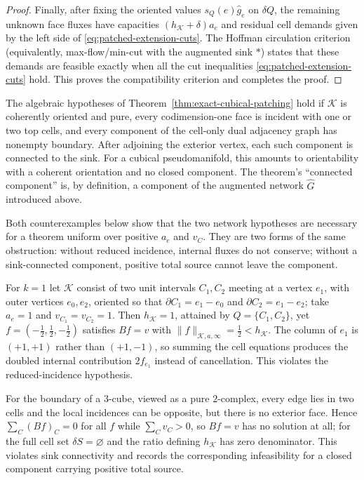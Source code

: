 \begin{proof}
Finally, after fixing the oriented values
$s_Q(e)\widehat g_e$ on $\delta Q$, the remaining unknown
face fluxes have capacities $(h_{\mathcal K}+\delta)a_e$ and residual cell
demands given by the left side of \eqref{eq:patched-extension-cuts}.  The
Hoffman circulation criterion \cite{Hoffman1960} (equivalently, max-flow/min-cut with the
augmented sink $\ast$)
states that these demands are feasible exactly when all the cut inequalities
\eqref{eq:patched-extension-cuts} hold.  This proves the compatibility
criterion and completes the proof.
\end{proof}

\begin{remark}
The algebraic hypotheses of Theorem~\ref{thm:exact-cubical-patching} hold if
$\mathcal K$ is coherently oriented and pure, every codimension-one face is
incident with one or two top cells, and every component of the cell-only dual
adjacency graph has nonempty boundary. After adjoining the exterior vertex,
each such component is connected to the sink. For a cubical pseudomanifold,
this amounts to orientability with a coherent orientation and no closed
component. The theorem's ``connected component'' is, by definition, a
component of the augmented network $\widehat G$ introduced above.

Both counterexamples below show that the two network hypotheses are necessary
for a theorem uniform over positive $a_e$ and $v_C$. They are two forms of the
same obstruction: without reduced incidence, internal fluxes do not conserve;
without a sink-connected component, positive total source cannot leave the
component.

For $k=1$ let $\mathcal K$ consist of two unit intervals $C_1,C_2$ meeting at a
vertex $e_1$, with outer vertices $e_0,e_2$, oriented so that
$\partial C_1=e_1-e_0$ and $\partial C_2=e_1-e_2$; take $a_e=1$ and
$v_{C_1}=v_{C_2}=1$. Then $h_{\mathcal K}=1$, attained by
$Q=\{C_1,C_2\}$, yet $f=(-\tfrac12,\tfrac12,-\tfrac12)$ satisfies $Bf=v$
with $\|f\|_{\mathcal K,a,\infty}=\tfrac12<h_{\mathcal K}$. The column of
$e_1$ is $(+1,+1)$ rather than $(+1,-1)$, so summing the cell equations
produces the doubled internal contribution $2f_{e_1}$ instead of cancellation.
This violates the reduced-incidence hypothesis.

For the boundary of a $3$-cube, viewed as a pure $2$-complex, every edge lies
in two cells and the local incidences can be opposite, but there is no exterior
face. Hence $\sum_C(Bf)_C=0$ for all $f$ while $\sum_Cv_C>0$, so $Bf=v$ has
no solution at all; for the full cell set $\delta S=\varnothing$ and the
ratio defining $h_{\mathcal K}$ has zero denominator. This violates sink
connectivity and records the corresponding infeasibility for a closed
component carrying positive total source.
\end{remark}

